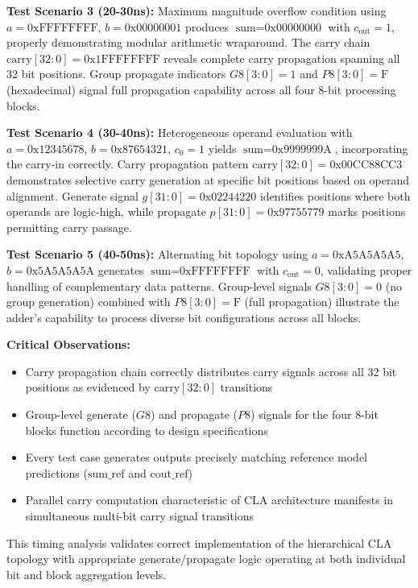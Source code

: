 \documentclass[a4paper, 11pt]{article}
\begin{document}
\textbf{Test Scenario 3 (20-30ns):} Maximum magnitude overflow condition using $a = \text{0xFFFFFFFF}$, $b = \text{0x00000001}$ produces $\text{sum} = \text{0x00000000}$ with $c_{\text{out}} = 1$, properly demonstrating modular arithmetic wraparound. The carry chain $\text{carry}[32:0] = \text{0x1FFFFFFFF}$ reveals complete carry propagation spanning all 32 bit positions. Group propagate indicators $G8[3:0] = 1$ and $P8[3:0] = \text{F}$ (hexadecimal) signal full propagation capability across all four 8-bit processing blocks.

\textbf{Test Scenario 4 (30-40ns):} Heterogeneous operand evaluation with $a = \text{0x12345678}$, $b = \text{0x87654321}$, $c_0 = 1$ yields $\text{sum} = \text{0x9999999A}$, incorporating the carry-in correctly. Carry propagation pattern $\text{carry}[32:0] = \text{0x00CC88CC3}$ demonstrates selective carry generation at specific bit positions based on operand alignment. Generate signal $g[31:0] = \text{0x02244220}$ identifies positions where both operands are logic-high, while propagate $p[31:0] = \text{0x97755779}$ marks positions permitting carry passage.

\textbf{Test Scenario 5 (40-50ns):} Alternating bit topology using $a = \text{0xA5A5A5A5}$, $b = \text{0x5A5A5A5A}$ generates $\text{sum} = \text{0xFFFFFFFF}$ with $c_{\text{out}} = 0$, validating proper handling of complementary data patterns. Group-level signals $G8[3:0] = 0$ (no group generation) combined with $P8[3:0] = \text{F}$ (full propagation) illustrate the adder's capability to process diverse bit configurations across all blocks.

\textbf{Critical Observations:}
\begin{itemize}
    \item Carry propagation chain correctly distributes carry signals across all 32 bit positions as evidenced by $\text{carry}[32:0]$ transitions
    \item Group-level generate ($G8$) and propagate ($P8$) signals for the four 8-bit blocks function according to design specifications
    \item Every test case generates outputs precisely matching reference model predictions ($\text{sum\_ref}$ and $\text{cout\_ref}$)
    \item Parallel carry computation characteristic of CLA architecture manifests in simultaneous multi-bit carry signal transitions
\end{itemize}

This timing analysis validates correct implementation of the hierarchical CLA topology with appropriate generate/propagate logic operating at both individual bit and block aggregation levels.
\end{document}
